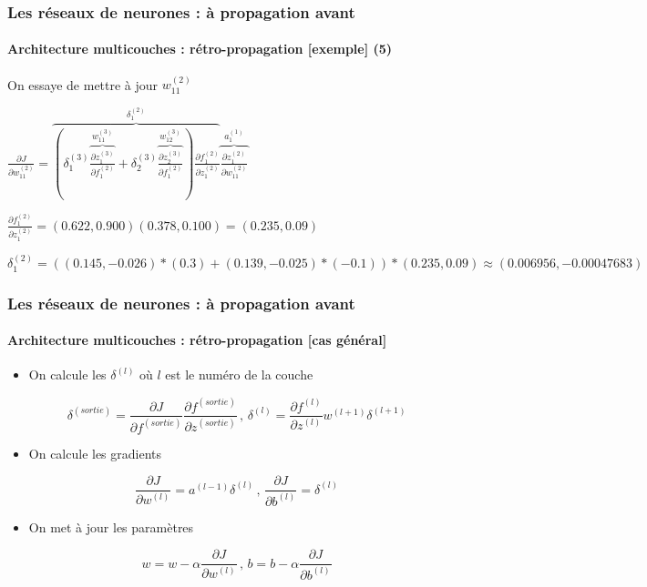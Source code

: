 \documentclass[xcolor=table]{beamer}
\begin{document}
\begin{frame}
\frametitle{Les réseaux de neurones : à propagation avant}
\framesubtitle{Architecture multicouches : rétro-propagation [exemple] (5)}

On essaye de mettre à jour $w_{11}^{(2)}$

$
\frac{\partial J}{\partial w_{11}^{(2)}} = 
\overbrace{ 
\left(
	\delta_{1}^{(3)} 
	\overbrace{
		\frac{\partial z_{1}^{(3)}}{\partial f_{1}^{(2)}}
	}^{w_{11}^{(3)}}
	+
	\delta_{2}^{(3)} 
	\overbrace{
		\frac{\partial z_{2}^{(3)}}{\partial f_{1}^{(2)}}
	}^{w_{12}^{(3)}}
\right)
\frac{\partial f_{1}^{(2)}}{\partial z_{1}^{(2)}}
}^{\delta_{1}^{(2)}} 
\overbrace{
	\frac{\partial z_{1}^{(2)}}{\partial w_{11}^{(2)}}
}^{a_{1}^{(1)}}
$

$
\frac{\partial f_{1}^{(2)}}{\partial z_{1}^{(2)}} = (0.622, 0.900) (0.378, 0.100) = (0.235, 0.09)
$

$
\delta_{1}^{(2)} = \left((0.145, -0.026) * (0.3) + (0.139, -0.025) * (-0.1)\right) * (0.235, 0.09) \approx (0.006956, -0.00047683)
$


%

\end{frame}

\begin{frame}
\frametitle{Les réseaux de neurones : à propagation avant}
\framesubtitle{Architecture multicouches : rétro-propagation [cas général]}

\begin{itemize}
	\item On calcule les $\delta^{(l)}$ où $l$ est le numéro de la couche
\end{itemize}

\[ 
\delta^{(sortie)} = 
\frac{\partial J}{\partial f^{(sortie)}} \frac{\partial f^{(sortie)}}{\partial z^{(sortie)}}
\,,\,
\delta^{(l)} = \frac{\partial f^{(l)}}{\partial z^{(l)}} w^{(l+1)} \delta^{(l+1)}
\]

\begin{itemize}
	\item On calcule les gradients
\end{itemize}

\[ 
\frac{\partial J}{\partial w^{(l)}} = a^{(l-1)} \delta^{(l)}
\,,\,
\frac{\partial J}{\partial b^{(l)}} = \delta^{(l)}
\]

\begin{itemize}
	\item On met à jour les paramètres
\end{itemize}

\[ 
w = w - \alpha \frac{\partial J}{\partial w^{(l)}}
\,,\,
b = b - \alpha \frac{\partial J}{\partial b^{(l)}}
\]


\end{frame}
\end{document}
